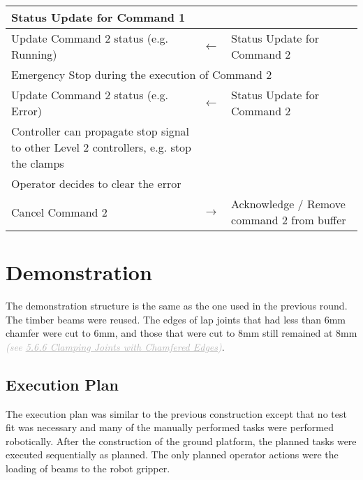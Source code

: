 \begin{table}[H]
\begin{adjustbox}{max width=\textwidth}
\begin{tabular}{p{7.04cm}p{1.67cm}p{7.17cm}}
\multicolumn{1}{|p{7.17cm}|}{{\footnotesize Status Update for Command 1}} \\ 
\hline
\multicolumn{1}{|p{7.04cm}}{{\footnotesize Update Command 2 status (e.g. Running)}} & 
\multicolumn{1}{|p{1.67cm}}{\centering
{\footnotesize $\leftarrow$}} & 
\multicolumn{1}{|p{7.17cm}|}{{\footnotesize Status Update for Command 2}} \\ 
\hline
\multicolumn{3}{|p{15.87cm}|}{{\footnotesize Emergency Stop during the execution of Command 2}} \\ 
\hline
\multicolumn{1}{|p{7.04cm}}{{\footnotesize Update Command 2 status (e.g. Error)}} & 
\multicolumn{1}{|p{1.67cm}}{\centering
{\footnotesize $\leftarrow$}} & 
\multicolumn{1}{|p{7.17cm}|}{{\footnotesize Status Update for Command 2}} \\ 
\hline
\multicolumn{1}{|p{7.04cm}}{{\footnotesize Controller can propagate stop signal to other Level 2 controllers, e.g. stop the clamps}} & 
\multicolumn{1}{|p{1.67cm}}{} & 
\multicolumn{1}{|p{7.17cm}|}{} \\ 
\hline
\multicolumn{3}{|p{15.87cm}|}{{\footnotesize Operator decides to clear the error}} \\ 
\hline
\multicolumn{1}{|p{7.04cm}}{{\footnotesize Cancel Command 2}} & 
\multicolumn{1}{|p{1.67cm}}{\centering
{\footnotesize $\rightarrow$}} & 
\multicolumn{1}{|p{7.17cm}|}{{\footnotesize Acknowledge / Remove command 2 from buffer}} \\ 
\hline
\end{tabular}
\end{adjustbox}
\end{table}
\vspace{3\baselineskip}

\section{Demonstration}

The demonstration structure is the same as the one used in the previous round. The timber beams were reused. The edges of lap joints that had less than 6mm chamfer were cut to 6mm, and those that were cut to 8mm still remained at 8mm \textit{\textcolor[HTML]{B7B7B7}{(see \uline{5.6.6 Clamping Joints with Chamfered Edges})}}. 

\subsection{Execution Plan}

The execution plan was similar to the previous construction except that no test fit was necessary and many of the manually performed tasks were performed robotically. After the construction of the ground platform, the planned tasks were executed sequentially as planned. The only planned operator actions were the loading of beams to the robot gripper. 

